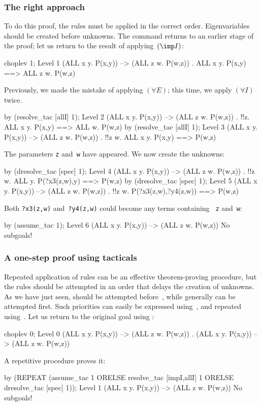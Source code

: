 \subsubsection{The right approach}
To do this proof, the rules must be applied in the correct order.
Eigenvariables should be created before unknowns.  The
 command returns to an earlier stage of the proof;
let us return to the result of applying~$({\imp}I)$:
\begin{ttbox}
choplev 1;
{\out Level 1}
{\out (ALL x y. P(x,y)) --> (ALL z w. P(w,z))}
{. ALL x y. P(x,y) ==> ALL z w. P(w,z)}
\end{ttbox}
Previously, we made the mistake of applying $(\forall E)$; this time, we
apply $(\forall I)$ twice.
\begin{ttbox}
by (resolve_tac [allI] 1);
{\out Level 2}
{\out (ALL x y. P(x,y)) --> (ALL z w. P(w,z))}
{. !!z. ALL x y. P(x,y) ==> ALL w. P(w,z)}
\ttbreak
by (resolve_tac [allI] 1);
{\out Level 3}
{\out (ALL x y. P(x,y)) --> (ALL z w. P(w,z))}
{. !!z w. ALL x y. P(x,y) ==> P(w,z)}
\end{ttbox}
The parameters {\tt z} and~{\tt w} have appeared.  We now create the
unknowns:
\begin{ttbox}
by (dresolve_tac [spec] 1);
{\out Level 4}
{\out (ALL x y. P(x,y)) --> (ALL z w. P(w,z))}
{. !!z w. ALL y. P(?x3(z,w),y) ==> P(w,z)}
\ttbreak
by (dresolve_tac [spec] 1);
{\out Level 5}
{\out (ALL x y. P(x,y)) --> (ALL z w. P(w,z))}
{. !!z w. P(?x3(z,w),?y4(z,w)) ==> P(w,z)}
\end{ttbox}
Both {\tt?x3(z,w)} and~{\tt?y4(z,w)} could become any terms containing {\tt
z} and~{\tt w}:
\begin{ttbox}
by (assume_tac 1);
{\out Level 6}
{\out (ALL x y. P(x,y)) --> (ALL z w. P(w,z))}
{\out No subgoals!}
\end{ttbox}

\subsubsection{A one-step proof using tacticals}
Repeated application of rules can be an effective theorem-proving
procedure, but the rules should be attempted in an order that delays the
creation of unknowns.  As we have just seen,  should be
attempted before~, while  generally can
be attempted first.  Such priorities can easily be expressed
using~, and repeated using~.  Let us return
to the original goal using :
\begin{ttbox}
choplev 0;
{\out Level 0}
{\out (ALL x y. P(x,y)) --> (ALL z w. P(w,z))}
{. (ALL x y. P(x,y)) --> (ALL z w. P(w,z))}
\end{ttbox}
A repetitive procedure proves it:
\begin{ttbox}
by (REPEAT (assume_tac 1
     ORELSE resolve_tac [impI,allI] 1
     ORELSE dresolve_tac [spec] 1));
{\out Level 1}
{\out (ALL x y. P(x,y)) --> (ALL z w. P(w,z))}
{\out No subgoals!}
\end{ttbox}


